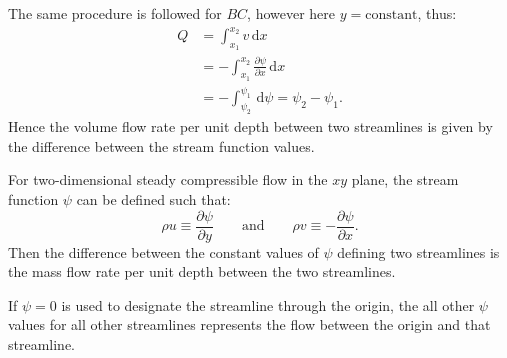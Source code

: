 The same procedure is followed for $BC$, however here $y = \mathrm{constant}$, thus:
\begin{align*}
  Q &= \int_{x_1}^{x_2} v \, \mathrm{d}x  \\
  &= - \int_{x_1}^{x_2} \frac{\partial \psi}{\partial x} \, \mathrm{d}x  \\
  &= - \int_{\psi_2}^{\psi_1} \, \mathrm{d}\psi = \psi_2 - \psi_1
.\end{align*}
Hence the volume flow rate per unit depth between two streamlines is given by the difference between the stream function values.

For two-dimensional steady compressible flow in the $xy$ plane, the stream function $\psi$ can be defined such that:
\[ 
\rho u \equiv \frac{\partial \psi}{\partial y} \qquad \mathrm{and} \qquad \rho v \equiv - \frac{\partial \psi}{\partial x}
.\]
Then the difference between the constant values of $\psi$ defining two streamlines is the mass flow rate per unit depth between the two streamlines. 

If $\psi = 0$ is used to designate the streamline through the origin, the all other $\psi$ values for all other streamlines represents the flow between the origin and that streamline.
